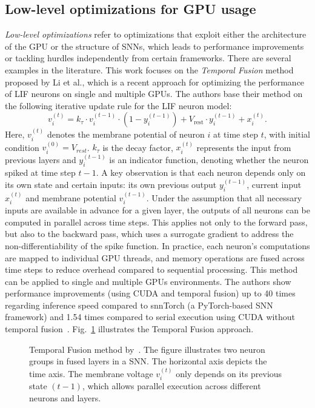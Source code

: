 \subsection{Low-level optimizations for \ac{GPU} usage}
\textit{Low-level optimizations} refer to optimizations that exploit either the architecture of the \ac{GPU} or the structure of \acp{SNN}, which leads to performance improvements or tackling hurdles independently from certain frameworks.
There are several examples in the literature. 
This work focuses on the \textit{Temporal Fusion} method proposed by Li et al., which is a recent approach for optimizing the performance of \ac{LIF} neurons on single and multiple \acp{GPU}.
The authors base their method on the following iterative update rule for the \ac{LIF} neuron model:
\begin{equation}
    v_i^{(t)} = k_{\tau} \cdot v_i^{(t-1)} \cdot (1 - y_i^{(t-1)}) + V_{\text{rest}} \cdot y_i^{(t-1)} + x_i^{(t)}.
    \label{lilif}
\end{equation}
Here, \( v_i^{(t)} \) denotes the membrane potential of neuron \( i \) at time step \( t \), with initial condition \( v_i^{(0)} = V_{rest} \).
\( k_{\tau} \) is the decay factor, \( x_i^{(t)} \) represents the input from previous layers and \( y_i^{(t-1)} \) is an indicator function, denoting whether the neuron spiked at time step \( t-1 \).
A key observation is that each neuron depends only on its own state and certain inputs: its own previous output \( y_i^{(t-1)} \), current input \( x_i^{(t)} \) and membrane potential \( v_i^{(t-1)} \).
Under the assumption that all necessary inputs are available in advance for a given layer, the outputs of all neurons can be computed in parallel across time steps.
This applies not only to the forward pass, but also to the backward pass, which uses a surrogate gradient to address the non-differentiability of the spike function.
In practice, each neuron's computations are mapped to individual \ac{GPU} threads, and memory operations are fused across time steps to reduce overhead compared to sequential processing.
This method can be applied to single and multiple \acp{GPU} environments.
The authors show performance improvements (using CUDA and temporal fusion) up to 40 times regarding inference speed compared to snnTorch (a PyTorch-based \ac{SNN} framework) and 1.54 times compared to serial execution using CUDA without temporal fusion~\cite{li_towards_2024}.
Fig.~\ref{fig:temporalfusion} illustrates the Temporal Fusion approach.

\begin{figure}
    \centering
    
    \caption[Temporal Fusion method]
    {Temporal Fusion method by~\cite{li_towards_2024}.
    The figure illustrates two neuron groups in fused layers in a \ac{SNN}.
     The horizontal axis depicts the time axis. 
     The membrane voltage \(v_i^{(t)}\) only depends on its previous state \((t-1)\), which allows parallel execution across different neurons and layers.} 
    \label{fig:temporalfusion}
\end{figure}


